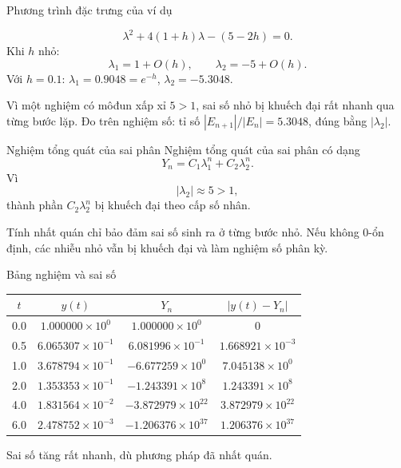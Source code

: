 \documentclass[aspectratio=43]{beamer}
\begin{document}
\begin{frame}{Phương trình đặc trưng của ví dụ}
\begin{tcolorbox}[title={Phương trình đặc trưng tương ứng}, colback=softgreen, colframe=tealgreen, colbacktitle=tealgreen]
\[
 \lambda^2+4(1+h)\lambda-(5-2h)=0.
\]
Khi $h$ nhỏ:
\[
 \lambda_1=1+O(h),
 \qquad
 \lambda_2=-5+O(h).
\]
Với $h=0.1$: $\lambda_1=0.9048=e^{-h}$, $\lambda_2=-5.3048$.
\end{tcolorbox}
\begin{tcolorbox}[title={Nhận xét}, colback=softred, colframe=warnred, colbacktitle=warnred]
Vì một nghiệm có môđun xấp xỉ $5>1$, sai số nhỏ bị khuếch đại rất nhanh qua từng bước lặp. Đo trên nghiệm số: tỉ số $|E_{n+1}|/|E_n| = 5.3048$, đúng bằng $|\lambda_2|$.
\end{tcolorbox}
\end{frame}
\begin{frame}
\begin{baitapbox}{Nghiệm tổng quát của sai phân}
Nghiệm tổng quát của sai phân có dạng
\[
 Y_n=C_1\lambda_1^n+C_2\lambda_2^n.
\]
Vì
\[
 |\lambda_2|\approx 5>1,
\]
thành phần $C_2\lambda_2^n$ bị khuếch đại theo cấp số nhân.
\end{baitapbox}
\begin{tcolorbox}[title={}, colback=softred, colframe=warnred, colbacktitle=warnred]
Tính nhất quán chỉ bảo đảm sai số sinh ra ở từng bước nhỏ. Nếu không 0-ổn định, các nhiễu nhỏ vẫn bị khuếch đại và làm nghiệm số phân kỳ.
\end{tcolorbox}
\end{frame}
\begin{frame}{Bảng nghiệm và sai số}
\begin{center}
\scriptsize
\begin{tabular}{cccc}
\toprule
$t$ & $y(t)$ & $Y_n$ & $|y(t)-Y_n|$ \\
\midrule
0.0 & $1.000000\times10^{0}$ & $1.000000\times10^{0}$ & $0$ \\
0.5 & $6.065307\times10^{-1}$ & $6.081996\times10^{-1}$ & $1.668921\times10^{-3}$ \\
1.0 & $3.678794\times10^{-1}$ & $-6.677259\times10^{0}$ & $7.045138\times10^{0}$ \\
2.0 & $1.353353\times10^{-1}$ & $-1.243391\times10^{8}$ & $1.243391\times10^{8}$ \\
4.0 & $1.831564\times10^{-2}$ & $-3.872979\times10^{22}$ & $3.872979\times10^{22}$ \\
6.0 & $2.478752\times10^{-3}$ & $-1.206376\times10^{37}$ & $1.206376\times10^{37}$ \\
\bottomrule
\end{tabular}
\end{center}
\begin{tcolorbox}[title={Nhận xét}, colback=softgreen, colframe=tealgreen, colbacktitle=tealgreen]
Sai số tăng rất nhanh, dù phương pháp đã nhất quán.
\end{tcolorbox}
\end{frame}
\end{document}
